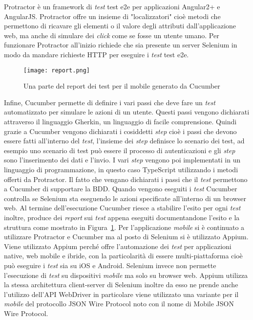 Protractor è un \gls{framework}\ap{[g]} di \emph{test} \gls{test e2e} per applicazioni Angular2+ e AngularJS. Protractor offre un insieme di "localizzatori" cioè metodi che permettono di ricavare gli elementi o il valore degli attributi dall'applicazione web, ma anche di simulare dei \emph{click} come se fosse un utente umano. Per funzionare Protractor all'inizio richiede che sia presente un server Selenium in modo da mandare richieste HTTP per eseguire i \emph{test} \gls{test e2e}.

\begin{figure}[h] 
	\begin{center}
		\texttt{[image: report.png]}
		\caption{Una parte del report dei test per il mobile generato da Cucumber}\label{fig:testDoc}
	\end{center}
\end{figure}

Infine, Cucumber permette di definire i vari passi che deve fare un \emph{test} automatizzato per simulare le azioni di un utente. Questi passi vengono dichiarati attraverso il linguaggio Gherkin, un linguaggio di facile comprensione. Quindi grazie a Cucumber vengono dichiarati i cosiddetti \emph{step} cioè i passi che devono essere fatti all'interno del \emph{test}, l'insieme dei \emph{step} definisce lo scenario dei test, ad esempio uno scenario di test può essere il processo di autenticazioni e gli \emph{step} sono l'inserimento dei dati e l'invio. I vari \emph{step} vengono poi implementati in un linguaggio di programmazione, in questo caso TypeScript utilizzando i metodi offerti da Protractor. Il fatto che vengano dichiarati i passi che il \emph{test} permettono a Cucumber di supportare la BDD. Quando vengono eseguiti i \emph{test} Cucumber controlla se Selenium sta eseguendo le azioni specificate all’interno di un \gls{browser web}\ap{[g]}. Al termine dell'esecuzione Cucumber riesce a stabilire l'esito per ogni \emph{test} inoltre, produce dei \emph{report} sui \emph{test} appena eseguiti documentandone l'esito e la struttura come mostrato in Figura~\ref{fig:testDoc}.
\clearpage
Per l'applicazione \emph{mobile} si è continuato a utilizzare Protractor e Cucumber ma al posto di Selenium si è utilizzato Appium. Viene utilizzato Appium perché offre l'automazione dei \emph{test} per applicazioni native, web mobile e ibride, con la particolarità di essere multi-piattaforma cioè può eseguire i \emph{test} sia su \gls{iOS}\ap{[g]} e \gls{Android}\ap{[g]}. Selenium invece non permette l'esecuzione di \emph{test} su dispositivi \emph{mobile} ma solo su \gls{browser web}\ap{[g]}. Appium utilizza la stessa architettura client-server di Selenium inoltre da esso ne prende anche l'utilizzo dell'API WebDriver in particolare viene utilizzato una variante per il \emph{mobile} del protocollo JSON Wire Protocol noto con il nome di Mobile JSON Wire Protocol. 

